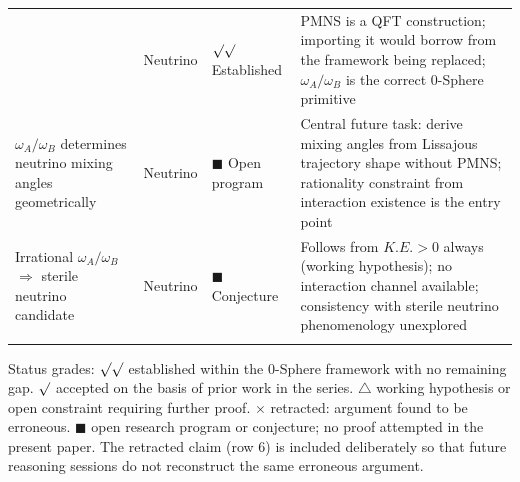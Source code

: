 \documentclass[%
 reprint, amsmath,amssymb, aps, prb, ]{revtex4-2}
\numberwithin{equation}{section}
\begin{document}
\begin{table}[t!]
\begin{tabular}{p{4.2cm}p{1.8cm}p{2.4cm}p{6.6cm}}
& Neutrino
& $\surd\surd$ Established
& PMNS is a QFT construction; importing it would borrow from the framework being replaced; $\omega_A/\omega_B$ is the correct 0-Sphere primitive \\
\addlinespace[0.3cm]
$\omega_A/\omega_B$ determines neutrino mixing angles geometrically
& Neutrino
& $\blacksquare$ Open program
& Central future task: derive mixing angles from Lissajous trajectory shape without PMNS; rationality constraint from interaction existence is the entry point \\
\addlinespace[0.3cm]
Irrational $\omega_A/\omega_B$ $\Rightarrow$ sterile neutrino candidate
& Neutrino
& $\blacksquare$ Conjecture
& Follows from $K.E.>0$ always (working hypothesis); no interaction channel available; consistency with sterile neutrino phenomenology unexplored \\
\addlinespace[0.2cm]
\bottomrule
\end{tabular}
\vspace{0.2cm}
\begin{minipage}{0.95\textwidth}
\justifying\footnotesize
Status grades: $\surd\surd$ established within the 0-Sphere framework with no remaining gap. $\surd$ accepted on the basis of prior work in the series. $\triangle$ working hypothesis or open constraint requiring further proof. $\times$ retracted: argument found to be erroneous. $\blacksquare$ open research program or conjecture; no proof attempted in the present paper. The retracted claim (row 6) is included deliberately so that future reasoning sessions do not reconstruct the same erroneous argument.
\end{minipage}
\end{table}

\clearpage
\end{document}
